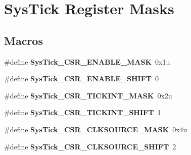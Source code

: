 \hypertarget{group___sys_tick___register___masks}{}\section{Sys\+Tick Register Masks}
\label{group___sys_tick___register___masks}
\subsection*{Macros}
\begin{DoxyCompactItemize}
\item 
\hypertarget{group___sys_tick___register___masks_gac780b47ad7830f8b054650cf9ae10600}{}\#define {\bfseries Sys\+Tick\+\_\+\+C\+S\+R\+\_\+\+E\+N\+A\+B\+L\+E\+\_\+\+M\+A\+S\+K}~0x1u\label{group___sys_tick___register___masks_gac780b47ad7830f8b054650cf9ae10600}

\item 
\hypertarget{group___sys_tick___register___masks_ga0f710afc23630b3797a50a76beec3418}{}\#define {\bfseries Sys\+Tick\+\_\+\+C\+S\+R\+\_\+\+E\+N\+A\+B\+L\+E\+\_\+\+S\+H\+I\+F\+T}~0\label{group___sys_tick___register___masks_ga0f710afc23630b3797a50a76beec3418}

\item 
\hypertarget{group___sys_tick___register___masks_ga8b51f1d83c7a482e111b09e4c5964a2b}{}\#define {\bfseries Sys\+Tick\+\_\+\+C\+S\+R\+\_\+\+T\+I\+C\+K\+I\+N\+T\+\_\+\+M\+A\+S\+K}~0x2u\label{group___sys_tick___register___masks_ga8b51f1d83c7a482e111b09e4c5964a2b}

\item 
\hypertarget{group___sys_tick___register___masks_ga7fc911092251c68f56bc4d2e68ffa0b2}{}\#define {\bfseries Sys\+Tick\+\_\+\+C\+S\+R\+\_\+\+T\+I\+C\+K\+I\+N\+T\+\_\+\+S\+H\+I\+F\+T}~1\label{group___sys_tick___register___masks_ga7fc911092251c68f56bc4d2e68ffa0b2}

\item 
\hypertarget{group___sys_tick___register___masks_ga7e5a1e63ec805119d87e8584a2404831}{}\#define {\bfseries Sys\+Tick\+\_\+\+C\+S\+R\+\_\+\+C\+L\+K\+S\+O\+U\+R\+C\+E\+\_\+\+M\+A\+S\+K}~0x4u\label{group___sys_tick___register___masks_ga7e5a1e63ec805119d87e8584a2404831}

\item 
\hypertarget{group___sys_tick___register___masks_ga99922ae5d9a4c34aa9e2c1673c65d8a4}{}\#define {\bfseries Sys\+Tick\+\_\+\+C\+S\+R\+\_\+\+C\+L\+K\+S\+O\+U\+R\+C\+E\+\_\+\+S\+H\+I\+F\+T}~2\label{group___sys_tick___register___masks_ga99922ae5d9a4c34aa9e2c1673c65d8a4}


\end{DoxyCompactItemize}
